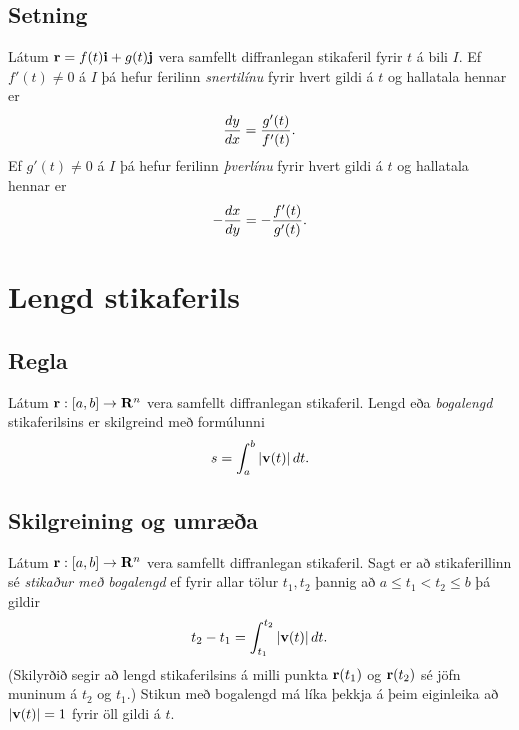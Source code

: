 \documentclass[a4paper,10pt,icelandic]{sphinxmanual}
\begin{document}
\subsection{Setning}
\label{Kafli1:index-5}\label{Kafli1:id7}
Látum \(\mbox{${\bf r}$}=f(t)\mbox{${\bf i}$}+g(t)\mbox{${\bf j}$}\)
vera samfellt diffranlegan stikaferil fyrir \(t\) á bili \(I\).
Ef \(f'(t) \neq 0\) á \(I\) þá hefur ferilinn \textit{snertilínu} fyrir
hvert gildi á \(t\) og hallatala hennar er
\begin{gather}
\begin{split}\displaystyle \frac{dy}{dx} = \frac{g'(t)}{f'(t)}.\end{split}\notag
\end{gather}
Ef \(g'(t) \neq 0\) á \(I\) þá hefur ferilinn \textit{þverlínu} fyrir
hvert gildi á \(t\) og hallatala hennar er
\begin{gather}
\begin{split}\displaystyle -\frac{dx}{dy} = -\frac{f'(t)}{g'(t)}.\end{split}\notag
\end{gather}

\section{Lengd stikaferils}
\label{Kafli1:lengd-stikaferils}\label{Kafli1:index-6}

\subsection{Regla}
\label{Kafli1:regla}
Látum \(\mbox{${\bf r}$}:  [a,b]\rightarrow \mbox{${\bf R}^n$}\)
vera samfellt diffranlegan stikaferil. Lengd eða \textit{bogalengd}
stikaferilsins er skilgreind með formúlunni
\begin{gather}
\begin{split}\displaystyle s=\int_a^b |\mbox{${\bf v}$}(t)|\,dt.\end{split}\notag
\end{gather}

\subsection{Skilgreining og umræða}
\label{Kafli1:index-7}\label{Kafli1:skilgreining-og-umraea}
Látum \(\mbox{${\bf r}$}: [a,b]\rightarrow \mbox{${\bf R}^n$}\) vera
samfellt diffranlegan stikaferil. Sagt er að stikaferillinn sé \emph{stikaður
með bogalengd} ef fyrir allar tölur \(t_1,
t_2\) þannig að \(a\leq t_1<t_2\leq b\) þá gildir
\begin{gather}
\begin{split}\displaystyle t_2-t_1= \int_{t_1}^{t_2} |\mbox{${\bf v}$}(t)|\,dt.\end{split}\notag
\end{gather}
(Skilyrðið segir að lengd stikaferilsins á milli punkta
\(\mbox{${\bf r}$}(t_1)\) og \(\mbox{${\bf r}$}(t_2)\) sé jöfn
muninum á \(t_2\) og \(t_1\).) Stikun með bogalengd má líka
þekkja á þeim eiginleika að \(|\mbox{${\bf v}$}(t)|=1\) fyrir öll
gildi á \(t\).
\end{document}
